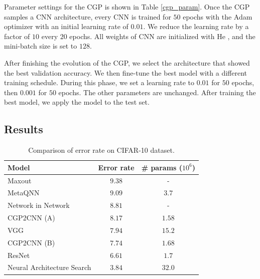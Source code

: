 Parameter settings for the CGP is shown in Table \ref{cgp_param}.
Once the CGP samples a CNN architecture, every CNN is trained for $50$ epochs with the Adam optimizer \cite{kingma_adam:_2015} with an initial learning rate of $0.01$.
We reduce the learning rate by a factor of $10$ every $20$ epochs.
All weights of CNN are initialized with He \cite{he_delving_2015}, and the mini-batch size is set to $128$.

After finishing the evolution of the CGP, we select the architecture that showed the best validation accuracy.
We then fine-tune the best model with a different training schedule.
During this phase, we set a learning rate to $0.01$ for $50$ epochs, then $0.001$ for $50$ epochs.
The other parameters are unchanged.
After training the best model, we apply the model to the test set.

\subsection{Results}

\begin{table}[t]
  \caption{Comparison of error rate on CIFAR-10 dataset.}
  \label{results}
  \begin{tabular}{l|c|c} \hline
    Model & Error rate & \# params ($10^6$) \\ \hline
   Maxout \cite{} & $9.38$ & - \\ 
   MetaQNN \cite{baker_designing_2016} \footnotemark & $9.09$ & $3.7$ \\
   Network in Network \cite{} & $8.81$ & - \\
   CGP2CNN (A) & $8.17$ & $1.58$ \\
   VGG \cite{simonyan_very_2014} \footnotemark & $7.94$ & $15.2$ \\
   CGP2CNN (B) & $7.74$ & $1.68$ \\
   ResNet \cite{he_deep_2016} & $6.61$ & $1.7$ \\
   Neural Architecture Search \cite{zoph_neural_2016} & $3.84$ & $32.0$ \\ \hline
  \end{tabular}
\end{table}

